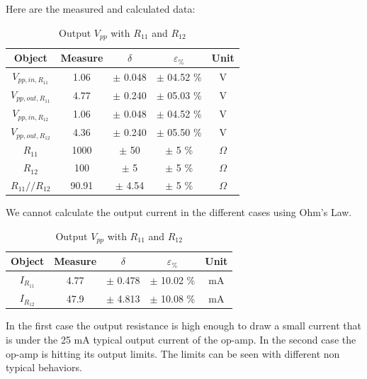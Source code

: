 \documentclass[../main.tex]{subfiles}
\begin{document}
Here are the measured and calculated data:

\begin{table}[h!]
\centering	

\begin{tabular}{ccccc}
\textbf{Object} & \textbf{Measure}   & \textbf{$\delta$} & \textbf{$\varepsilon_{\%}$} & \textbf{Unit} \\
\hline
$V_{pp,in,R_{11}}$  & 1.06  & $\pm$ 0.048 & $\pm$ 04.52 \% &  V \\ 
\hline
$V_{pp,out,R_{11}}$ & 4.77 & $\pm$ 0.240 & $\pm$ 05.03 \% &  V \\ 
\hline
$V_{pp,in,R_{12}}$  & 1.06  & $\pm$ 0.048 & $\pm$ 04.52 \% &  V \\ 
\hline
$V_{pp,out,R_{12}}$ & 4.36 & $\pm$ 0.240 & $\pm$ 05.50 \% &  V \\ 
\hline
$R_{11}$ & 1000 & $\pm$ 50 & $\pm$ 5 \% &  $\Omega$ \\ 
\hline
$R_{12}$ & 100 &  $\pm$ 5 & $\pm$ 5 \% &  $\Omega$ \\ 
\hline
$R_{11} // R_{12}$ & 90.91 & $\pm$ 4.54 & $\pm$ 5 \% &  $\Omega$ \\ 

\end{tabular}
\caption*{Output $V_{pp}$ with $R_{11}$ and $R_{12}$}
\end{table}

We cannot calculate the output current in the different cases using Ohm's Law.

\begin{table}[h!]
\centering	

\begin{tabular}{ccccc}
\textbf{Object} & \textbf{Measure}   & \textbf{$\delta$} & \textbf{$\varepsilon_{\%}$} & \textbf{Unit} \\
\hline
$I_{R_{11}}$  &  4.77 & $\pm$ 0.478 & $\pm$ 10.02 \% &  mA \\ 
\hline
$I_{R_{12}}$  &  47.9 & $\pm$ 4.813 & $\pm$ 10.08 \% &  mA \\


\end{tabular}
\caption*{Output $V_{pp}$ with $R_{11}$ and $R_{12}$}
\end{table}


In the first case the output resistance is high enough to draw a small current that is under the 25 mA typical output current of the op-amp.
In the second case the op-amp is hitting its output limits.
The limits can be seen with different non typical behaviors.
\end{document}
